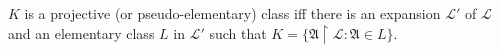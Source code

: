$K$ is a projective (or pseudo-elementary) class iff there is an expansion $\mathcal{L}'$ of $\mathcal{L}$ and an elementary class $L$ in $\mathcal{L}'$ such that $K = \{\mathfrak{A} \upharpoonright \mathcal{L} : \mathfrak{A} \in L\}$.
